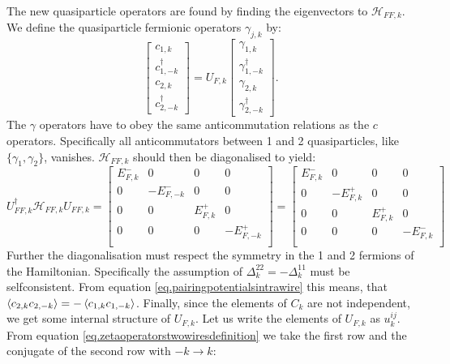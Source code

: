 The new quasiparticle operators are found by finding the eigenvectors to $\mathcal{H}_{FF,k}$. We define the quasiparticle fermionic operators $\gamma_{j,k}$ by:
\begin{equation}
\begin{bmatrix} c_{1,k} \\ c^\dagger_{1,-k} \\ c_{2,k} \\ c^\dagger_{2,-k} \end{bmatrix} = U_{F,k}\begin{bmatrix} \gamma_{1,k} \\ \gamma^{\dagger}_{1,-k} \\ \gamma_{2,k} \\ \gamma^{\dagger}_{2,-k} \end{bmatrix}.
\label{eq.zetaoperatorstwowiresdefinition}
\end{equation} 
The $\gamma$ operators have to obey the same anticommutation relations as the $c$ operators. Specifically all anticommutators between 1 and 2 quasiparticles, like $\{\gamma_1, \gamma_2 \} $, vanishes. $\mathcal{H}_{FF,k}$ should then be diagonalised to yield:
\begin{equation}
U^\dagger_{FF,k}\mathcal{H}_{FF,k}U_{FF,k} = \begin{bmatrix} 
E^{-}_{F,k} & 0        & 0       & 0        \\ 
0       & -E^{-}_{F,-k} & 0       & 0        \\ 
0       & 0        & E^{+}_{F,k} & 0        \\ 
0       & 0        & 0       & -E^{+}_{F,-k} \\ 
\end{bmatrix} = \begin{bmatrix} 
E^{-}_{F,k} & 0        & 0       & 0        \\ 
0       & -E^{+}_{F,k} & 0       & 0        \\ 
0       & 0        & E^{+}_{F,k} & 0        \\ 
0       & 0        & 0       & -E^{-}_{F,k} \\ 
\end{bmatrix} \nonumber
\end{equation}
Further the diagonalisation must respect the symmetry in the 1 and 2 fermions of the Hamiltonian. Specifically the assumption of $\Delta^{22}_k = -\Delta^{11}_k$ must be selfconsistent. From equation \ref{eq.pairingpotentialsintrawire} this means, that $\braket{c_{2,k}c_{2,-k}} = -\braket{c_{1,k}c_{1,-k}}$. Finally, since the elements of $C_k$ are not independent, we get some internal structure of $U_{F,k}$. Let us write the elements of $U_{F,k}$ as $u^{ij}_k$. From equation \eqref{eq.zetaoperatorstwowiresdefinition} we take the first row and the conjugate of the second row with $-k \to k$:
